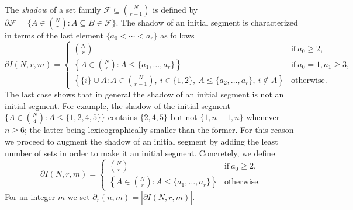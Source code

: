 \documentclass[reqno,english]{amsart}
\numberwithin{claimcounter}{theorem}
\theoremstyle{remark}
\theoremstyle{definition}
\numberwithin{theorem}{section}
\begin{document}
The \emph{shadow} of a set family $\mathcal{F} \subseteq \binom{N}{r+1}$ is defined by $\partial \mathcal{F} = \{A\in \binom{N}{r} \colon A\subseteq B \in \mathcal{F}\}$.
The shadow of an initial segment is characterized in terms of the last element $\{a_0<\cdots <a_r\}$ as follows
$$\partial I(N,r,m) = 
\begin{cases} 
    \binom{N}{r} & \text{if}~a_0\geq 2, \\
    \left \{A \in \binom{N}{r} \colon A \leq \{a_1,\dots, a_r\} \right \} & \text{if}~a_0=1, a_1\geq 3,\\
    \left \{ \{i\} \cup A \colon A \in \binom{N}{r-1},~i\in \{1,2\},~A\leq \{a_2,\dots, a_r\},~i\notin A  \right \} & \text{otherwise.}
\end{cases}$$
The last case shows that in general the shadow of an initial segment is not an initial segment.
For example, the shadow of the initial segment $\{A\in \binom{N}{4}\colon A \leq \{1,2,4,5\}\}$ contains $\{2,4,5\}$
but not $\{1,n-1,n\}$ whenever $n\geq 6$; the latter being lexicographically smaller than the former.
For this reason we proceed to augment the shadow of an initial segment by adding the least number of sets in order to make it an initial segment.
Concretely, we define
$$\overline{\partial I(N,r,m)} = 
\begin{cases} 
    \binom{N}{r} & \text{if}~a_0\geq 2, \\
    \left \{A \in \binom{N}{r} \colon A \leq \{a_1,\dots, a_r\} \right \} &  \text{otherwise.}
\end{cases}$$
For an integer $m$ we set $\partial_r(n,m) = |\overline{\partial I(N,r,m)}|$.
\end{document}
